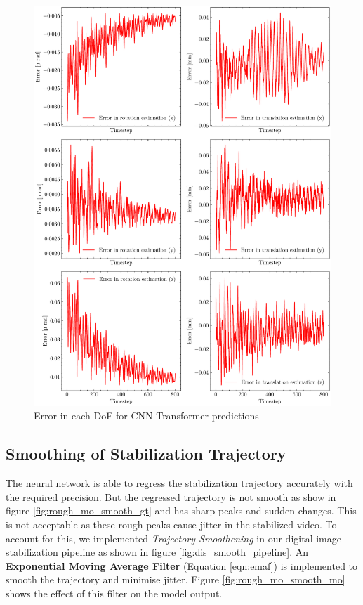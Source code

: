 \begin{figure}[H]
    \centering
    \includegraphics[scale=0.52]{images/fig_chapter4/nn_related/error_in_predicted_vs_ground_truth_transformer.pdf}
    \caption{Error in each DoF for CNN-Transformer predictions}
    \label{fig:cnn_trans_error}
\end{figure}

\subsection{Smoothing of Stabilization Trajectory}
The neural network is able to regress the stabilization trajectory accurately with the required precision. But the regressed trajectory is not smooth as show in figure \ref{fig:rough_mo_smooth_gt} and has sharp peaks and sudden changes. This is not acceptable as these rough peaks cause jitter in the stabilized video. To account for this, we implemented \textit{Trajectory-Smoothening} in our digital image stabilization pipeline as shown in figure \ref{fig:dis_smooth_pipeline}. An \textbf{Exponential Moving Average Filter} (Equation \ref{eqn:emaf}) is implemented to smooth the trajectory and minimise jitter. Figure \ref{fig:rough_mo_smooth_mo} shows the effect of this filter on the model output.

